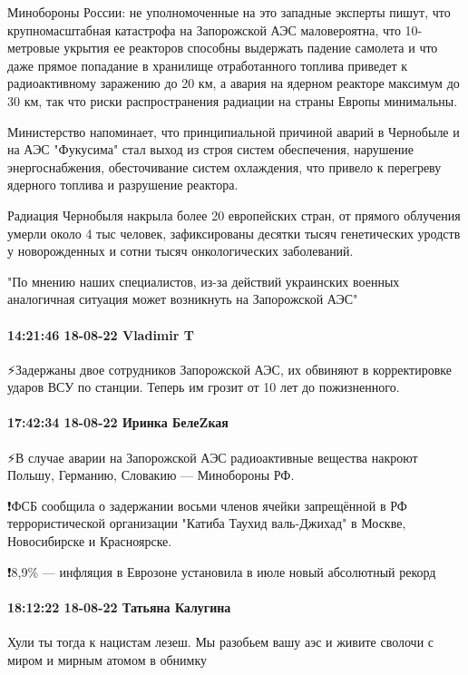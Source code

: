 Минобороны России: не уполномоченные на это западные эксперты пишут, что
крупномасштабная катастрофа на Запорожской АЭС маловероятна, что 10-метровые
укрытия ее реакторов способны выдержать падение самолета и что даже прямое
попадание в хранилище отработанного топлива приведет к радиоактивному заражению
до 20 км, а авария на ядерном реакторе максимум до 30 км, так что риски
распространения радиации на страны Европы минимальны.

Министерство напоминает, что принципиальной причиной аварий в Чернобыле и на
АЭС "Фукусима" стал выход из строя систем обеспечения, нарушение
энергоснабжения, обесточивание систем охлаждения, что привело к перегреву
ядерного топлива и разрушение реактора.

Радиация Чернобыля накрыла более 20 европейских стран, от прямого облучения
умерли около 4 тыс человек, зафиксированы десятки тысяч генетических уродств у
новорожденных и сотни тысяч онкологических заболеваний.

"По мнению наших специалистов, из-за действий украинских военных аналогичная
ситуация может возникнуть на Запорожской АЭС"

\paragraph{14:21:46 18-08-22 Vladimir T}

⚡️Задержаны двое сотрудников Запорожской АЭС, их обвиняют в корректировке
ударов ВСУ по станции.  Теперь им грозит от 10 лет до пожизненного.

\paragraph{17:42:34 18-08-22 Иринка БелеZкая}

⚡️В случае аварии на Запорожской АЭС радиоактивные вещества накроют Польшу,
Германию, Словакию — Минобороны РФ.

❗️ФСБ сообщила о задержании восьми членов ячейки запрещённой в РФ
террористической организации "Катиба Таухид валь-Джихад" в Москве, Новосибирске
и Красноярске.

❗️8,9\% — инфляция в Еврозоне установила в июле новый абсолютный рекорд

\paragraph{18:12:22 18-08-22 Татьяна Калугина}

Хули ты тогда к нацистам лезеш. Мы разобьем вашу аэс и живите сволочи с миром и
мирным атомом в обнимку

